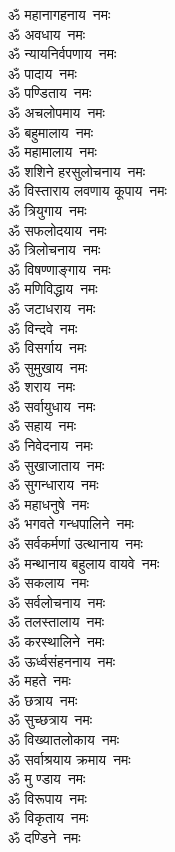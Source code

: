 \begin{multicols}{2}
\begin{flushleft}
ॐ महानागहनाय~नमः\hfill{}\\
ॐ अवधाय~नमः\\
ॐ न्यायनिर्वपणाय~नमः\\
ॐ पादाय~नमः\\
ॐ पण्डिताय~नमः\\
ॐ अचलोपमाय~नमः\\
ॐ बहुमालाय~नमः\\
ॐ महामालाय~नमः\\
ॐ शशिने हरसुलोचनाय~नमः\\
ॐ विस्ताराय लवणाय कूपाय~नमः\\
ॐ त्रियुगाय~नमः\hfill{}\\
ॐ सफलोदयाय~नमः\\
ॐ त्रिलोचनाय~नमः\\
ॐ विषण्णाङ्गाय~नमः\\
ॐ मणिविद्धाय~नमः\\
ॐ जटाधराय~नमः\\
ॐ विन्दवे~नमः\\
ॐ विसर्गाय~नमः\\
ॐ सुमुखाय~नमः\\
ॐ शराय~नमः\\
ॐ सर्वायुधाय~नमः\hfill{}\\
ॐ सहाय~नमः\\
ॐ निवेदनाय~नमः\\
ॐ सुखाजाताय~नमः\\
ॐ सुगन्धाराय~नमः\\
ॐ महाधनुषे~नमः\\
ॐ भगवते गन्धपालिने~नमः\\
ॐ सर्वकर्मणां उत्थानाय~नमः\\
ॐ मन्थानाय बहुलाय वायवे~नमः\\
ॐ सकलाय~नमः\\
ॐ सर्वलोचनाय~नमः\hfill{}\\
ॐ तलस्तालाय~नमः\\
ॐ करस्थालिने~नमः\\
ॐ ऊर्ध्वसंहननाय~नमः\\
ॐ महते~नमः\\
ॐ छत्राय~नमः\\
ॐ सुच्छत्राय~नमः\\
ॐ विख्यातलोकाय~नमः\\
ॐ सर्वाश्रयाय क्रमाय~नमः\\
ॐ मु ण्डाय~नमः\\
ॐ विरूपाय~नमः\hfill{}\\
ॐ विकृताय~नमः\\
ॐ दण्डिने~नमः\\

\end{flushleft}
\end{multicols}
